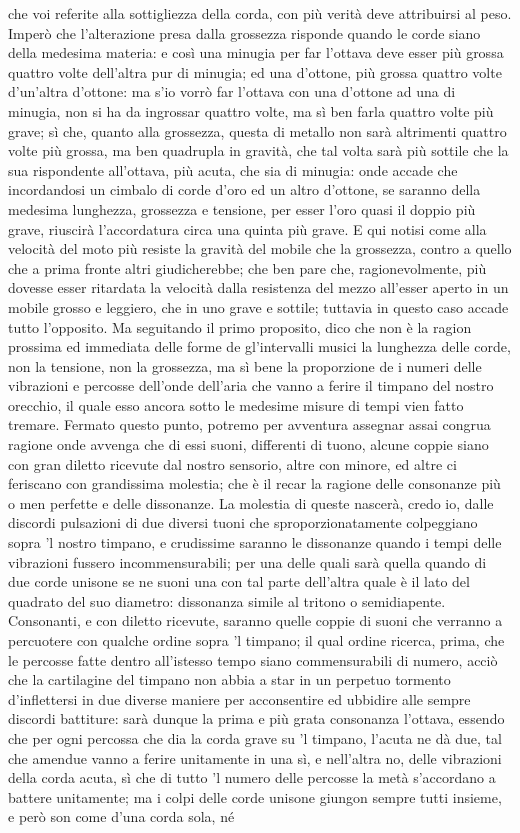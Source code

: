 \documentclass[11pt,twoside,openany]{book}
\begin{document}
che voi referite alla sottigliezza della corda, con più verità deve attribuirsi al peso. Imperò che l'alterazione presa dalla grossezza risponde quando le corde siano della medesima materia: e così una minugia per far l'ottava deve esser più grossa quattro volte dell'altra pur di minugia; ed una d'ottone, più grossa quattro volte d'un'altra d'ottone: ma s'io vorrò far l'ottava con una d'ottone ad una di minugia, non si ha da ingrossar quattro volte, ma sì ben farla quattro volte più grave; sì che, quanto alla grossezza, questa di metallo non sarà altrimenti quattro volte più grossa, ma ben quadrupla in gravità, che tal volta sarà più sottile che la sua rispondente all'ottava, più acuta, che sia di minugia: onde accade che incordandosi un cimbalo di corde d'oro ed un altro d'ottone, se saranno della medesima lunghezza, grossezza e tensione, per esser l'oro quasi il doppio più grave, riuscirà l'accordatura circa una quinta più grave. E qui notisi come alla velocità del moto più resiste la gravità del mobile che la grossezza, contro a quello che a prima fronte altri giudicherebbe; che ben pare che, ragionevolmente, più dovesse esser ritardata la velocità dalla resistenza del mezzo all'esser aperto in un mobile grosso e leggiero, che in uno grave e sottile; tuttavia in questo caso accade tutto l'opposito. Ma seguitando il primo proposito, dico che non è la ragion prossima ed immediata delle forme de gl'intervalli musici la lunghezza delle corde, non la tensione, non la grossezza, ma sì bene la proporzione de i numeri delle vibrazioni e percosse dell'onde dell'aria che vanno a ferire il timpano del nostro orecchio, il quale esso ancora sotto le medesime misure di tempi vien fatto tremare. Fermato questo punto, potremo per avventura assegnar assai congrua ragione onde avvenga che di essi suoni, differenti di tuono, alcune coppie siano con gran diletto ricevute dal nostro sensorio, altre con minore, ed altre ci feriscano con grandissima molestia; che è il recar la ragione delle consonanze più o men perfette e delle dissonanze. La molestia di queste nascerà, credo io, dalle discordi pulsazioni di due diversi tuoni che sproporzionatamente colpeggiano sopra 'l nostro timpano, e crudissime saranno le dissonanze quando i tempi delle vibrazioni fussero incommensurabili; per una delle quali sarà quella quando di due corde unisone se ne suoni una con tal parte dell'altra quale è il lato del quadrato del suo diametro: dissonanza simile al tritono o semidiapente. Consonanti, e con diletto ricevute, saranno quelle coppie di suoni che verranno a percuotere con qualche ordine sopra 'l timpano; il qual ordine ricerca, prima, che le percosse fatte dentro all'istesso tempo siano commensurabili di numero, acciò che la cartilagine del timpano non abbia a star in un perpetuo tormento d'inflettersi in due diverse maniere per acconsentire ed ubbidire alle sempre discordi battiture: sarà dunque la prima e più grata consonanza l'ottava, essendo che per ogni percossa che dia la corda grave su 'l timpano, l'acuta ne dà due, tal che amendue vanno a ferire unitamente in una sì, e nell'altra no, delle vibrazioni della corda acuta, sì che di tutto 'l numero delle percosse la metà s'accordano a battere unitamente; ma i colpi delle corde unisone giungon sempre tutti insieme, e però son come d'una corda sola, né 
\end{document}
